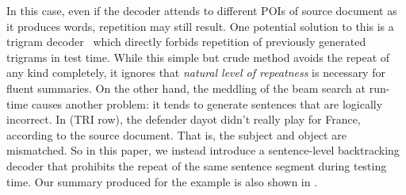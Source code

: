 In this case, even if the decoder attends to different POIs of 
source document as it produces words, repetition may still result.  
One potential solution to this is a trigram decoder~\cite{PaulusXS17} 
which directly forbids repetition of previously generated trigrams in
test time. While this simple but crude method avoids the repeat of any kind
completely, 
it ignores that \textit{natural level of repeatness} is necessary for fluent
summaries.  
On the other hand, the meddling of the beam search at run-time causes another problem: 
it tends to generate sentences that are logically incorrect. 
In  (TRI row), the defender dayot didn't
really play for France, according to the source document.
That is, the subject and object are mismatched.
So in this paper, we instead introduce a sentence-level backtracking decoder
that prohibits the repeat of the same sentence segment during testing time.
Our summary produced for the example is also shown in .

%


